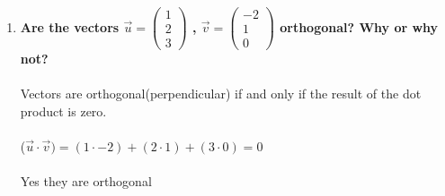 \documentclass{article}
\begin{document}
\begin{enumerate}[2.]
\item\textbf{Are the vectors $\vec{u}=\left(\!\begin{array}{c}1 \\ 2 \\  3\end{array} \!\right)$ , $\vec{v}=\left(\!\begin{array}{c}-2 \\ 1 \\  0\end{array} \!\right)$ orthogonal? Why or why not?}\\
\\
Vectors are orthogonal(perpendicular) if and only if the result of the dot product is zero.\\
\\
($\vec{u}\cdot\vec{v})=(1\cdot-2)+(2\cdot1)+(3\cdot0)=0$
\\
\\
Yes they are orthogonal 
\end{enumerate}
\end{document}
